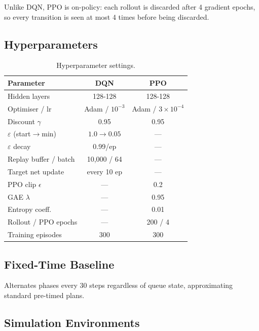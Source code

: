 \documentclass[10pt]{article}
\begin{document}
Unlike DQN, PPO is on-policy: each rollout is discarded after 4 gradient
epochs, so every transition is seen at most 4 times before being discarded.

\subsection{Hyperparameters}

\begin{table}[H]
\centering
\caption{Hyperparameter settings.}
\label{tab:hyper}
\begin{tabular}{lcc}
\toprule
\textbf{Parameter} & \textbf{DQN} & \textbf{PPO} \\
\midrule
Hidden layers              & 128-128           & 128-128 \\
Optimiser / lr             & Adam / $10^{-3}$  & Adam / $3{\times}10^{-4}$ \\
Discount $\gamma$          & 0.95              & 0.95 \\
$\varepsilon$ (start$\to$min) & $1.0\to0.05$ & — \\
$\varepsilon$ decay        & 0.99/ep           & — \\
Replay buffer / batch      & 10,000 / 64       & — \\
Target net update          & every 10 ep       & — \\
PPO clip $\epsilon$        & —                 & 0.2 \\
GAE $\lambda$              & —                 & 0.95 \\
Entropy coeff.             & —                 & 0.01 \\
Rollout / PPO epochs       & —                 & 200 / 4 \\
Training episodes          & 300               & 300 \\
\bottomrule
\end{tabular}
\end{table}

\subsection{Fixed-Time Baseline}

Alternates phases every 30 steps regardless of queue state, approximating
standard pre-timed plans.

\subsection{Simulation Environments}
\end{document}
